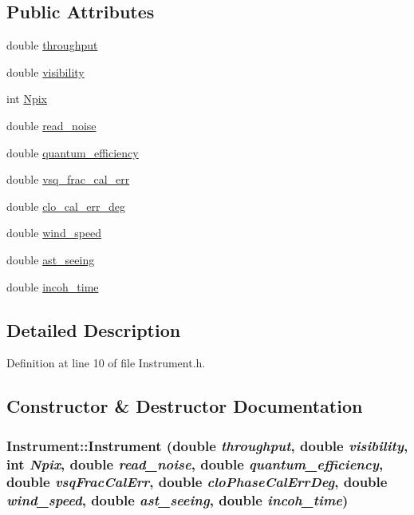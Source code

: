 \subsection*{Public Attributes}
\begin{DoxyCompactItemize}
\item 
double \hyperlink{classInstrument_a24c5a78025ce2474443eb34b8828df08}{throughput}
\item 
double \hyperlink{classInstrument_a8a79a07bd650ab75118beff9f46886a6}{visibility}
\item 
int \hyperlink{classInstrument_a349e2122c222f16ed712b5fb8660adb4}{Npix}
\item 
double \hyperlink{classInstrument_accb5f463e89c0c73d4c0e5b6b80397af}{read\_\-noise}
\item 
double \hyperlink{classInstrument_af352575aa1a6bb255db663a53fbb2b8b}{quantum\_\-efficiency}
\item 
double \hyperlink{classInstrument_ad51820f02768c7632da7d9136ace806f}{vsq\_\-frac\_\-cal\_\-err}
\item 
double \hyperlink{classInstrument_a755a26a3b1c7ea48fdcf213371254068}{clo\_\-cal\_\-err\_\-deg}
\item 
double \hyperlink{classInstrument_a7e18ced4e4e556e5203c046c2ebb3c63}{wind\_\-speed}
\item 
double \hyperlink{classInstrument_a508dcac890549428696372a66ed5d3bc}{ast\_\-seeing}
\item 
double \hyperlink{classInstrument_ab431265cc3192bfcc9ceeafd1d30605b}{incoh\_\-time}
\end{DoxyCompactItemize}


\subsection{Detailed Description}


Definition at line 10 of file Instrument.h.



\subsection{Constructor \& Destructor Documentation}
\hypertarget{classInstrument_af68972d40961b639787c594e3d62857e}{
\subsubsection[{Instrument}]{\setlength{\rightskip}{0pt plus 5cm}Instrument::Instrument (double {\em throughput}, \/  double {\em visibility}, \/  int {\em Npix}, \/  double {\em read\_\-noise}, \/  double {\em quantum\_\-efficiency}, \/  double {\em vsqFracCalErr}, \/  double {\em cloPhaseCalErrDeg}, \/  double {\em wind\_\-speed}, \/  double {\em ast\_\-seeing}, \/  double {\em incoh\_\-time})}}
\label{classInstrument_af68972d40961b639787c594e3d62857e}


